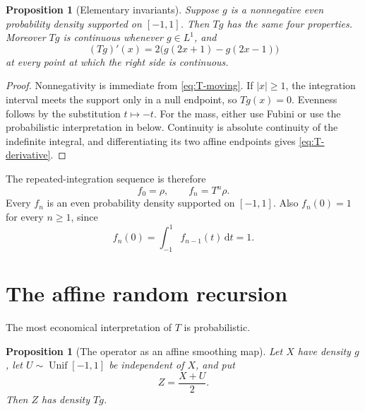 \documentclass[11pt,oneside]{article}
\newtheorem{proposition}[theorem]{Proposition}
\theoremstyle{definition}
\theoremstyle{remark}
\newcommand{\dd}{\,\mathrm d}
\newcommand{\Unif}{\operatorname{Unif}}
\begin{document}
\begin{proposition}[Elementary invariants]
\label{prop:invariants}
Suppose $g$ is a nonnegative even probability density supported on $[-1,1]$.  Then $Tg$ has
the same four properties.  Moreover $Tg$ is continuous whenever $g\in L^1$, and
\begin{equation}
 (Tg)'(x)=2\bigl(g(2x+1)-g(2x-1)\bigr)                     \label{eq:T-derivative}
\end{equation}
at every point at which the right side is continuous.
\end{proposition}

\begin{proof}
Nonnegativity is immediate from \eqref{eq:T-moving}.  If $|x|\ge1$, the integration interval
meets the support only in a null endpoint, so $Tg(x)=0$.  Evenness follows by the substitution
$t\mapsto-t$.  For the mass, either use Fubini or use the probabilistic interpretation in
 below.  Continuity is absolute continuity of the indefinite integral,
and differentiating its two affine endpoints gives \eqref{eq:T-derivative}.
\end{proof}

The repeated-integration sequence is therefore
\begin{equation}
 f_0=\rho,\qquad f_n=T^n\rho.                               \label{eq:fn-def}
\end{equation}
Every $f_n$ is an even probability density supported on $[-1,1]$.  Also
$f_n(0)=1$ for every $n\ge1$, since
\begin{equation}
 f_n(0)=\int_{-1}^{1}f_{n-1}(t)\dd t=1.                    \label{eq:center-one}
\end{equation}

\section{The affine random recursion}
\label{sec:probability}

The most economical interpretation of $T$ is probabilistic.

\begin{proposition}[The operator as an affine smoothing map]
\label{prop:affine-map}
Let $X$ have density $g$, let $U\sim\Unif[-1,1]$ be independent of $X$, and put
\begin{equation}
 Z=\frac{X+U}{2}.                                           \label{eq:affine-Z}
\end{equation}
Then $Z$ has density $Tg$.
\end{proposition}
\end{document}
